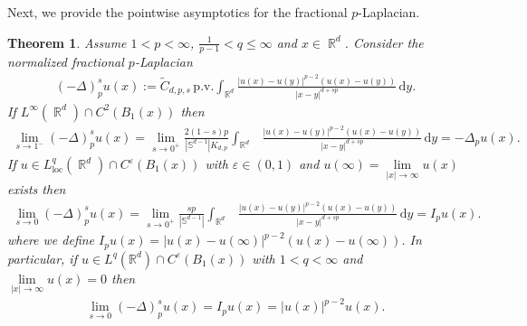 \documentclass[12pt, reqno]{amsart}%
\theoremstyle{plain}  %
\newtheorem{theorem}{Theorem}[section]
\theoremstyle{definition}  %
\theoremstyle{remark}
\numberwithin{equation}{section}
\DeclareMathOperator{\R}{\mathbb{R}}
\renewcommand{\d}{\,\mathrm{d}}
\begin{document}
Next, we provide the pointwise asymptotics for the fractional $p$-Laplacian.
\begin{theorem}
\label{thm:asymp-frac-plaplace}
Assume   $1<p<\infty$, $\frac{1}{p-1}<q\leq\infty$ and $x\in\R^d$. Consider the normalized fractional $p$-Laplacian
\begin{align*}
(-\Delta)^s_p u(x)
:= \widetilde{C}_{d,p,s}\,
\mathrm{p.v.}\int_{\mathbb{R}^d}
\frac{|u(x)-u(y)|^{p-2}(u(x)-u(y))}
{|x-y|^{d+sp}}\d y.
\end{align*}
If $L^\infty(\R^d)\cap C^2(B_1(x))$ then
\begin{align*}
\lim_{s\to 1^-}(-\Delta)^s_p u(x) = \lim_{s\to0^+} \frac{2(1-s)p}{|\mathbb S^{d-1}|K_{d,p}}\int_{\R^d}
&\frac{|u(x)-u(y)|^{p-2}(u(x)-u(y))}
{|x-y|^{d+sp}}\d y = -\Delta_p u(x).
\end{align*}
If  $u\in L^q_{\mathrm{loc}}(\R^d)\cap C^{\varepsilon}(B_1(x))$
with  $\varepsilon\in (0,1)$ and $u(\infty)=\lim\limits_{|x|\to\infty} u(x)$  exists then
\begin{align*}
\lim_{s\to0} (-\Delta)^s_p u(x)= \lim_{s\to0^+} \frac{sp}{|\mathbb S^{d-1}|}\int_{\R^d}
&\frac{|u(x)-u(y)|^{p-2}(u(x)-u(y))}
{|x-y|^{d+sp}}\d y= I_p u(x).
\end{align*}
where  we define $I_p u(x)=
|u(x)-u(\infty)|^{p-2}(u(x)-u(\infty))$. In particular, if $u\in L^q(\mathbb{R}^d)\cap C^{\varepsilon}(B_1(x))$ with $1<q<\infty$ and $\lim\limits_{|x|\to\infty} u(x)=0$   then
\begin{align*}
\lim_{s\to0} (-\Delta)^s_p u(x)=I_p u(x)=
|u(x)|^{p-2}u(x).
\end{align*}
\end{theorem}
\end{document}
